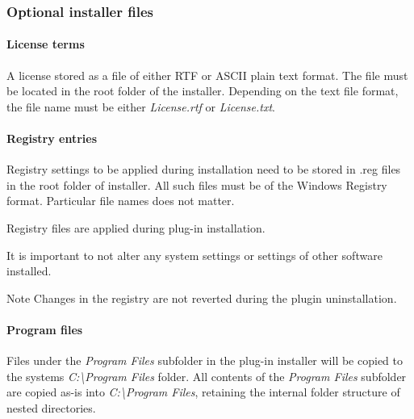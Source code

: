 \hypertarget{a00377_subsection__aax_venue_guide__installer__optional_files}{}\subsubsection{Optional installer files}\label{a00377_subsection__aax_venue_guide__installer__optional_files}
\hypertarget{a00377_subsubsection__aax_venue_guide__installer__optional_files__license}{}\paragraph{License terms}\label{a00377_subsubsection__aax_venue_guide__installer__optional_files__license}
 A license stored as a file of either R\+T\+F or A\+S\+C\+I\+I plain text format. The file must be located in the root folder of the installer. Depending on the text file format, the file name must be either {\itshape License.\+rtf} or {\itshape License.\+txt}.

\hypertarget{a00377_subsubsection__aax_venue_guide__installer__optional_files__registry}{}\paragraph{Registry entries}\label{a00377_subsubsection__aax_venue_guide__installer__optional_files__registry}
 Registry settings to be applied during installation need to be stored in .reg files in the root folder of installer. All such files must be of the Windows Registry format. Particular file names does not matter.

 Registry files are applied during plug-\/in installation.

 It is important to not alter any system settings or settings of other software installed.

 \begin{DoxyNote}{Note}
Changes in the registry are not reverted during the plugin uninstallation.
\end{DoxyNote}
\hypertarget{a00377_subsubsection__aax_venue_guide__installer__optional_files__program}{}\paragraph{Program files}\label{a00377_subsubsection__aax_venue_guide__installer__optional_files__program}
 Files under the {\itshape Program Files} subfolder in the plug-\/in installer will be copied to the system\textquotesingle{}s {\itshape C\+:\textbackslash{}Program Files} folder. All contents of the {\itshape Program Files} subfolder are copied as-\/is into {\itshape C\+:\textbackslash{}Program Files}, retaining the internal folder structure of nested directories.

